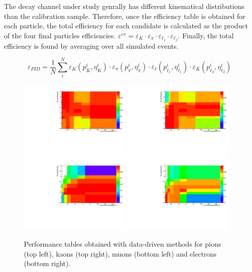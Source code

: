 The decay channel under study genrally has different kinematical distributions than the calibration sample.
Therefore, once the efficiency table is obtained for each particle, the total efficiency for each candidate
is calculated as the product of the four final particles efficiencies.
$\varepsilon^{ev} = \varepsilon_K\cdot\varepsilon_\pi\cdot\varepsilon_{\ell_1}\cdot\varepsilon_{\ell_2}$.
Finally, the total efficiency is found by averaging over all simulated events.

\begin{equation}
\varepsilon_{PID} = \frac{1}{N} \sum_i^N \varepsilon_K(p_K^i,\eta_K^i) \cdot \varepsilon_\pi(p_\pi^i,\eta_\pi^i) \cdot \varepsilon_\ell(p_{\ell_1}^i,\eta_{\ell_1}^i) \cdot \varepsilon_K(p_{\ell_2}^i,\eta_{\ell_2}^i)
\end{equation}

\begin{figure}[h!]
\centering
\includegraphics[width=0.48\textwidth]{RKst/figs/pid_Pi.pdf}
\includegraphics[width=0.48\textwidth]{RKst/figs/pid_K.pdf}
\includegraphics[width=0.48\textwidth]{RKst/figs/pid_Mu.pdf}
\includegraphics[width=0.48\textwidth]{RKst/figs/pid_e.pdf}
\caption{Performance tables obtained with data-driven methods
for pions (top left), kaons (top right), muons (bottom left) and electrons (bottom right).}
\label{fig:pid_perf_hist}
\end{figure}


